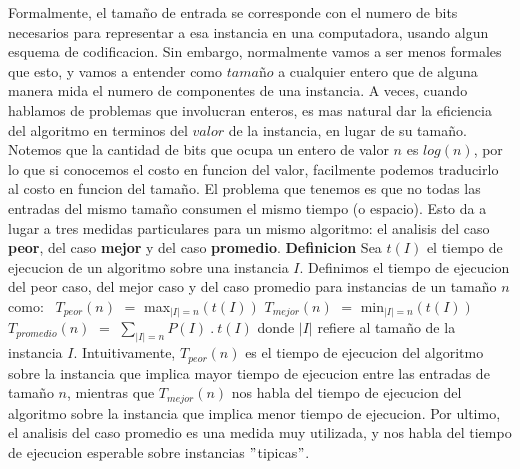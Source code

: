 \documentclass[10pt,a4paper]{article}
\begin{document}
Formalmente, el tamaño de entrada se corresponde con el numero de bits necesarios para representar a esa instancia en una computadora, usando algun esquema de codificacion. Sin embargo, normalmente vamos a ser menos formales que esto, y vamos a entender como $tama$ñ$o$ a cualquier entero que de alguna manera mida el numero de componentes de una instancia. A veces, cuando hablamos de problemas que involucran enteros, es mas natural dar la eficiencia del algoritmo en terminos del $valor$ de la instancia, en lugar de su tamaño. Notemos que la cantidad de bits que ocupa un entero de valor $n$ es $log(n)$, por
lo que si conocemos el costo en funcion del valor, facilmente podemos traducirlo al costo en funcion del tamaño. El problema que tenemos es que no todas las entradas del mismo  tamaño consumen el mismo tiempo (o espacio). Esto da a lugar a tres medidas particulares para un mismo algoritmo: el analisis del caso \textbf{peor}, del caso \textbf{mejor} y del caso \textbf{promedio}.
\newline
\newline
\textbf{Definicion}
\newline
\newline
Sea $t(I)$ el tiempo de ejecucion de un algoritmo sobre una instancia $I$. Definimos el tiempo de ejecucion del peor caso, del mejor caso y del caso promedio para instancias de un tamaño $n$ como: 
\newline
\newline
$T_{peor}(n)$ $=$ max$_{|I| = n}(t(I))$
\newline
\newline
$T_{mejor}(n)$ $=$ min$_{|I| = n}(t(I))$
\newline
\newline
$T_{promedio}(n)$ $=$ $\displaystyle \sum_{|I| = n}^{} P(I) ~.~ t(I)$
\newline
\newline
donde $|I|$ refiere al tamaño de la instancia $I$.
\newline
\newline
Intuitivamente, $T_{peor}(n)$ es el tiempo de ejecucion del algoritmo sobre la instancia que implica mayor tiempo de ejecucion entre las entradas de tamaño $n$, mientras que $T_{mejor}(n)$ nos habla del tiempo de ejecucion del algoritmo sobre la instancia que implica menor tiempo de ejecucion. Por ultimo, el analisis del caso promedio es una medida muy utilizada, y nos habla del tiempo de ejecucion esperable sobre instancias $"$tipicas$"$.
\newline
\newline
\end{document}

